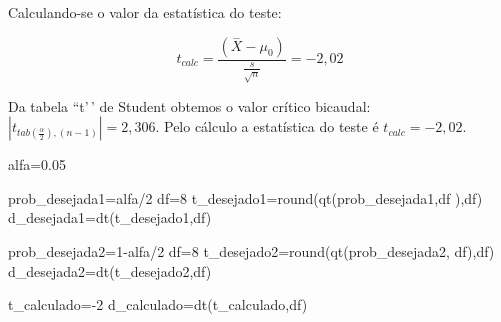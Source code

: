 \documentclass[
]{book}
\newenvironment{Shaded}{\begin{snugshade}}{\end{snugshade}}
\newcommand{\DecValTok}[1]{\textcolor[rgb]{0.00,0.00,0.81}{#1}}
\newcommand{\FloatTok}[1]{\textcolor[rgb]{0.00,0.00,0.81}{#1}}
\newcommand{\FunctionTok}[1]{\textcolor[rgb]{0.00,0.00,0.00}{#1}}
\newcommand{\NormalTok}[1]{#1}
\newcommand{\OtherTok}[1]{\textcolor[rgb]{0.56,0.35,0.01}{#1}}
\newcommand{\SpecialCharTok}[1]{\textcolor[rgb]{0.00,0.00,0.00}{#1}}
\begin{document}
\hfill\break

Calculando-se o valor da estatística do teste:

\hfill\break

\[
t_{calc} = \frac{(\stackrel{-}{X} - \mu_{0})}{    \frac{s}{\sqrt{n}} }  = -2,02
\]

\hfill\break

Da tabela ``t'\,' de Student obtemos o valor crítico bicaudal: \(|{t}_{tab\left(\frac{\alpha }{2}\right), (n-1)}|=2,306\). Pelo cálculo a estatística do teste é \(t_{calc}=-2,02\).

\hfill\break

\begin{Shaded}
\begin{Highlighting}[]
\NormalTok{alfa}\OtherTok{=}\FloatTok{0.05}

\NormalTok{prob\_desejada1}\OtherTok{=}\NormalTok{alfa}\SpecialCharTok{/}\DecValTok{2}
\NormalTok{df}\OtherTok{=}\DecValTok{8}
\NormalTok{t\_desejado1}\OtherTok{=}\FunctionTok{round}\NormalTok{(}\FunctionTok{qt}\NormalTok{(prob\_desejada1,df ),df)}
\NormalTok{d\_desejada1}\OtherTok{=}\FunctionTok{dt}\NormalTok{(t\_desejado1,df)}

\NormalTok{prob\_desejada2}\OtherTok{=}\DecValTok{1}\SpecialCharTok{{-}}\NormalTok{alfa}\SpecialCharTok{/}\DecValTok{2}
\NormalTok{df}\OtherTok{=}\DecValTok{8}
\NormalTok{t\_desejado2}\OtherTok{=}\FunctionTok{round}\NormalTok{(}\FunctionTok{qt}\NormalTok{(prob\_desejada2, df),df)}
\NormalTok{d\_desejada2}\OtherTok{=}\FunctionTok{dt}\NormalTok{(t\_desejado2,df)}

\NormalTok{t\_calculado}\OtherTok{=}\SpecialCharTok{{-}}\DecValTok{2}
\NormalTok{d\_calculado}\OtherTok{=}\FunctionTok{dt}\NormalTok{(t\_calculado,df)}



\end{Highlighting}
\end{Shaded}
\end{document}
